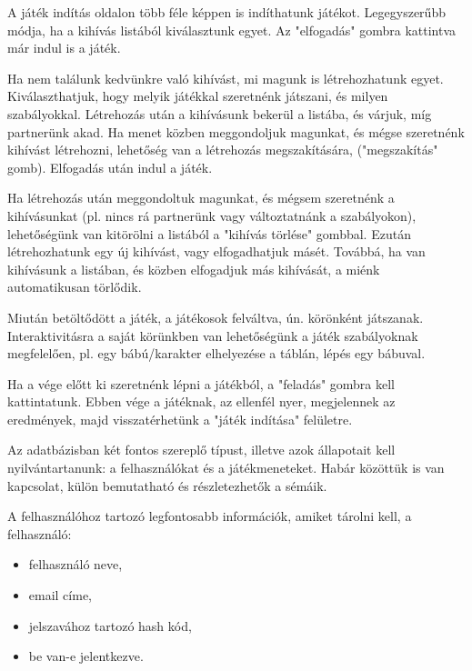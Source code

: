 A játék indítás oldalon több féle képpen is indíthatunk játékot. Legegyszerűbb módja, ha a kihívás listából kiválasztunk egyet. Az "elfogadás" gombra kattintva már indul is a játék.

Ha nem találunk kedvünkre való kihívást, mi magunk is létrehozhatunk egyet. Kiválaszthatjuk, hogy melyik játékkal szeretnénk játszani, és milyen szabályokkal. Létrehozás után a kihívásunk bekerül a listába, és várjuk, míg partnerünk akad. Ha menet közben meggondoljuk magunkat, és mégse szeretnénk kihívást létrehozni, lehetőség van a létrehozás megszakítására, ("megszakítás" gomb). Elfogadás után indul a játék.

Ha létrehozás után meggondoltuk magunkat, és mégsem szeretnénk a kihívásunkat (pl. nincs rá partnerünk vagy változtatnánk a szabályokon), lehetőségünk van kitörölni a listából a "kihívás törlése" gombbal. Ezután létrehozhatunk egy új kihívást, vagy elfogadhatjuk másét.
Továbbá, ha van kihívásunk a listában, és közben elfogadjuk más kihívását, a miénk automatikusan törlődik.

Miután betöltődött a játék, a játékosok felváltva, ún. körönként játszanak. Interaktivitásra a saját körünkben van lehetőségünk a játék szabályoknak megfelelően, pl. egy bábú/karakter elhelyezése a táblán, lépés egy bábuval.

Ha a vége előtt ki szeretnénk lépni a játékból, a "feladás" gombra kell kattintatunk. Ebben vége a játéknak, az ellenfél nyer, megjelennek az eredmények, majd visszatérhetünk a "játék indítása" felületre.



Az adatbázisban két fontos szereplő típust, illetve azok állapotait kell nyilvántartanunk: a felhasználókat és a játékmeneteket. Habár közöttük is van kapcsolat, külön bemutatható és részletezhetők a sémáik.

A felhasználóhoz tartozó legfontosabb információk, amiket tárolni kell, a felhasználó:
\begin{itemize}
	\item felhasználó neve,
	\item email címe,
	\item jelszavához tartozó hash kód,
	\item be van-e jelentkezve.
\end{itemize}

